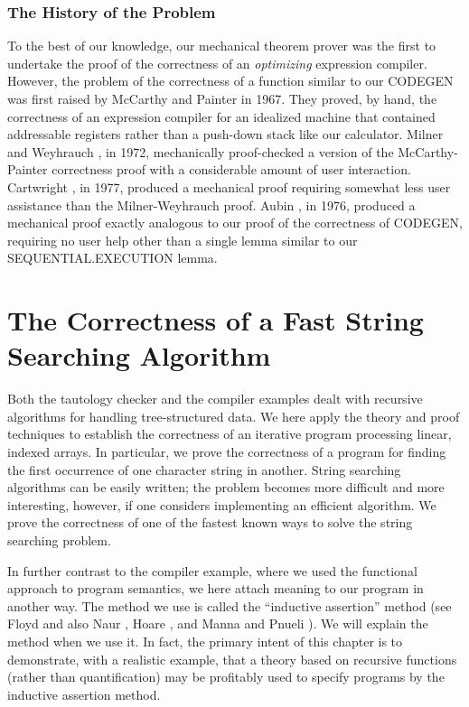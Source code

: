 \documentclass[11pt]{book}
\newcommand{\pubinlineunderline}[1]{\emph{#1}}
\newcommand{\pubdefaulttextsize}{\large}
\begin{document}
\subsection{The History of the Problem}
\pubdefaulttextsize
To the best of our knowledge, our mechanical theorem prover
was the first to undertake the proof of the correctness of an \pubinlineunderline{optimizing} expression compiler.
However, the problem of the correctness of a function similar to our
CODEGEN was first raised by McCarthy and Painter \cite{MCCPAINTER}
in 1967.  They proved, by hand, the correctness of an
expression compiler for an idealized
machine that contained addressable registers
rather than a push-down stack like our calculator.
Milner and Weyhrauch \cite{MILNER}, in 1972, mechanically  proof-checked
a version of
the
McCarthy-Painter correctness proof with a considerable amount of user
interaction.  Cartwright \cite{CARTWRIGHT}, in 1977, produced a mechanical
proof requiring somewhat less user assistance
than the Milner-Weyhrauch proof.
Aubin \cite{AUBIN}, in 1976, produced a mechanical proof exactly
analogous to our proof of the correctness of CODEGEN, requiring
no user help other than
a
single lemma similar to our SEQUENTIAL.EXECUTION lemma.
\chapter{The Correctness of a Fast String Searching Algorithm}
\label{SECFSTRPOS}
\pubdefaulttextsize
Both the tautology checker and the compiler examples dealt with
recursive algorithms for handling tree-structured data.  We  here
apply the theory and proof techniques to establish the correctness of an
iterative program processing linear, indexed arrays.  In particular,
we  prove the correctness of a program for finding the first occurrence
of one character string in another.
String searching algorithms can be easily written;
the problem becomes more difficult and more interesting, however, if one
considers implementing an efficient algorithm.  We  prove the
correctness of one of the fastest known ways to solve the string
searching problem.

In further contrast to the compiler example, where we used the
functional approach to program semantics, we  here attach meaning
to our program in another way.  The method we  use is called
the ``inductive assertion'' method (see Floyd \cite{FLOYD} and
also Naur \cite{NAUR}, Hoare \cite{HOARE}, and Manna and Pnueli \cite{MANNA}).
We will explain the method when we use it.
In fact, the primary intent of this chapter is to demonstrate,
with a realistic example, that a theory based on recursive functions (rather than quantification)
may be profitably used to specify programs by the inductive assertion
method.
\end{document}
